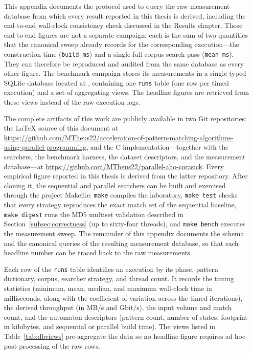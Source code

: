 This appendix documents the protocol used to query the raw measurement
database from which every result reported in this thesis is derived, including
the end-to-end wall-clock consistency check discussed in the Results chapter.
Those end-to-end figures are not a separate campaign: each is the sum of two
quantities that the canonical sweep already records for the corresponding
execution---the construction time (\texttt{build\_ms}) and a single full-corpus
search pass (\texttt{mean\_ms}). They can therefore be reproduced and audited
from the same database as every other figure.
The benchmark campaign stores its measurements in a single typed SQLite
database located at
,
containing one \texttt{runs} table (one row per timed execution) and a
set of aggregating views. The headline figures are retrieved from these views
instead of the raw execution logs.


The complete artifacts of this work are publicly available in two Git
repositories: the \LaTeX{} source of this document at
\url{https://github.com/MTheus22/acceleration-of-pattern-matching-algorithms-using-parallel-programming},
and the C implementation---together with the searchers, the benchmark harness,
the dataset descriptors, and the measurement database---at
\url{https://github.com/MTheus22/parallel-aho-corasick}. Every empirical figure
reported in this thesis is derived from the latter repository. After cloning it,
the sequential and parallel searchers can be built and exercised through the
project Makefile: \texttt{make} compiles the laboratory, \texttt{make test}
checks that every strategy reproduces the exact match set of the sequential
baseline, \texttt{make digest} runs the MD5 multiset validation described in
Section~\ref{subsec:correctness} (up to sixty-four threads), and
\texttt{make bench} executes the measurement sweep. The remainder of this
appendix documents the schema and the canonical queries of the resulting
measurement database, so that each headline number can be traced back to the
raw measurements.


Each row of the \texttt{runs} table identifies an execution by its phase,
pattern dictionary, corpus, searcher strategy, and thread count. It records the
timing statistics (minimum, mean, median, and maximum wall-clock time in
milliseconds, along with the coefficient of variation across the timed
iterations), the derived throughput (in MB/s and Gbit/s), the input volume and
match count, and the automaton descriptors (pattern count, number of states,
footprint in kibibytes, and sequential or parallel build time). The views
listed in Table~\ref{tab:dbviews} pre-aggregate the data so no headline
figure requires ad hoc post-processing of the raw rows.

